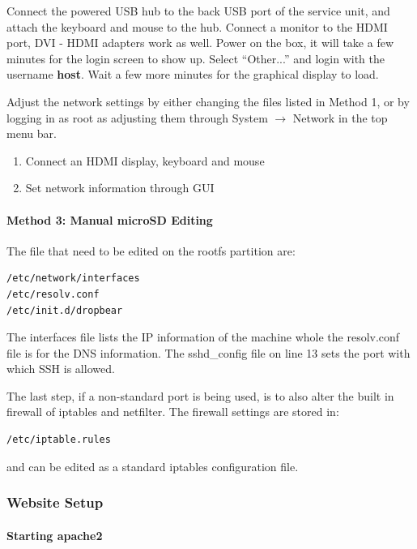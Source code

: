 Connect the powered USB hub to the back USB port of the service unit, and attach the keyboard and mouse to the hub.
Connect a monitor to the HDMI port, DVI - HDMI adapters work as well.
Power on the box, it will take a few minutes for the login screen to show up.
Select ``Other...'' and login with the username \textbf{host}.
Wait a few more minutes for the graphical display to load.

Adjust the network settings by either changing the files listed in Method 1, or by logging in as root as adjusting them through System $\rightarrow$ Network in the top menu bar.

\begin{enumerate}
\item{Connect an HDMI display, keyboard and mouse}
\item{Set network information through GUI}
\end{enumerate}


\paragraph{Method 3: Manual microSD Editing}

The file that need to be edited on the rootfs partition are:

\begin{verbatim}
/etc/network/interfaces
/etc/resolv.conf
/etc/init.d/dropbear
\end{verbatim}

The interfaces file lists the IP information of the machine whole the resolv.conf file is for the DNS information.
The sshd\_config file on line 13 sets the port with which SSH is allowed.

The last step, if a non-standard port is being used, is to also alter the built in firewall of iptables and netfilter.
The firewall settings are stored in:

\begin{verbatim}
/etc/iptable.rules
\end{verbatim}

and can be edited as a standard iptables configuration file.

\subsubsection{Website Setup}

\paragraph{Starting apache2}


